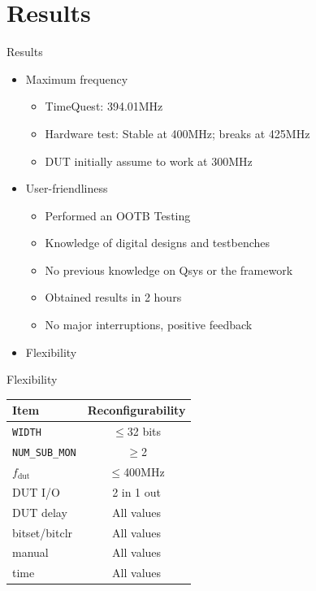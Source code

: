 \documentclass[t]{beamer}
\begin{document}
\section{Results}
\begin{frame}{Results}
\begin{itemize}
  \item<+-> Maximum frequency
  \begin{itemize}
    \item TimeQuest: 394.01MHz
    \item Hardware test: Stable at 400MHz; breaks at 425MHz
    \item DUT initially assume to work at 300MHz \newline
  \end{itemize}
  \item<+-> User-friendliness
  \begin{itemize}
    \item Performed an OOTB Testing
    \item Knowledge of digital designs and testbenches
    \item No previous knowledge on Qsys or the framework
    \item Obtained results in 2 hours
    \item No major interruptions, positive feedback \newline
  \end{itemize}
  \item<+-> Flexibility
\end{itemize}
\end{frame}

\begin{frame}{Flexibility}
  \begin{table}[H]
    \centering
    \begin{tabular}{|l|c|}
      \hline
      Item                  & Reconfigurability \\
      \hline
      \texttt{WIDTH}        & $\le$32 bits \\
      \texttt{NUM\_SUB\_MON}& $\ge$2       \\
      $f_{\text{dut}}$      & $\le$400MHz  \\
      DUT I/O               & 2 in 1 out   \\
      DUT delay             & All values   \\
      bitset/bitclr         & All values   \\
      manual                & All values   \\
      time                  & All values   \\
      \hline
    \end{tabular}
  \end{table}
\end{frame}
\end{document}

